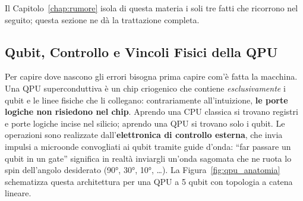 
Il Capitolo~\ref{chap:rumore} isola di questa materia i soli tre fatti che ricorrono nel
seguito; questa sezione ne d\`a la trattazione completa.

\subsection{Qubit, Controllo e Vincoli Fisici della QPU}

Per capire dove nascono gli errori bisogna prima capire com'è fatta la macchina. Una \ac{QPU} superconduttiva è un chip criogenico che contiene \emph{esclusivamente} i qubit e le linee fisiche che li collegano: contrariamente all'intuizione, \textbf{le porte logiche non risiedono nel chip}. Aprendo una CPU classica si trovano registri e porte logiche incise nel silicio; aprendo una QPU si trovano solo i qubit. Le operazioni sono realizzate dall'\textbf{elettronica di controllo esterna}, che invia impulsi a microonde convogliati ai qubit tramite guide d'onda: ``far passare un qubit in un gate'' significa in realtà inviargli un'onda sagomata che ne ruota lo spin dell'angolo desiderato (90°, 30°, 10°, \ldots). La Figura~\ref{fig:qpu_anatomia} schematizza questa architettura per una QPU a 5 qubit con topologia a catena lineare.

